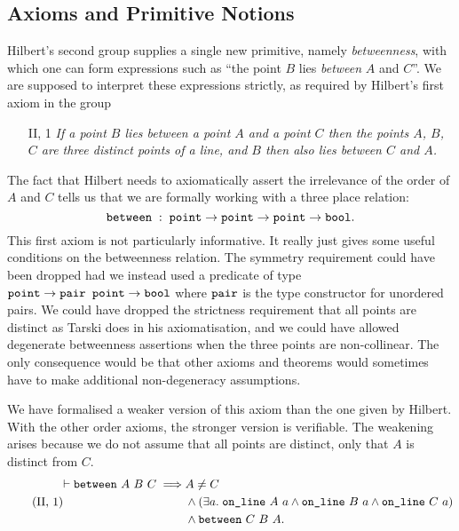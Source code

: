 \subsection{Axioms and Primitive Notions}
Hilbert's second group supplies a single new primitive, namely \emph{betweenness}, with which one can form expressions such as ``the point $B$ lies \emph{between} $A$ and $C$''. We are supposed to interpret these expressions strictly, as required by Hilbert's first axiom in the group
\begin{enumerate}
\item[II, 1] \emph{If a point $B$ lies between a point $A$ and a point $C$ then the points $A$, $B$, $C$ are three distinct points of a line, and $B$ then also lies between $C$ and $A$.}
\end{enumerate}
The fact that Hilbert needs to axiomatically assert the irrelevance of the order of $A$ and $C$ tells us that we are formally working with a three place relation:
\begin{displaymath}
\texttt{between}\;:\;\texttt{point}\rightarrow\texttt{point}\rightarrow\texttt{point}\rightarrow\texttt{bool}.
\end{displaymath}
This first axiom is not particularly informative. It really just gives some useful conditions on the betweenness relation. The symmetry requirement could have been dropped had we instead used a predicate of type $\texttt{point}\rightarrow \texttt{pair point} \rightarrow \texttt{bool}$ where $\texttt{pair}$ is the type constructor for unordered pairs. We could have dropped the strictness requirement that all points are distinct as Tarski does in his axiomatisation, and we could have allowed degenerate betweenness assertions when the three points are non-collinear. The only consequence would be that other axioms and theorems would sometimes have to make additional non-degeneracy assumptions.

We have formalised a weaker version of this axiom than the one given by Hilbert. With the other order axioms, the stronger version is verifiable. The weakening arises because we do not assume that all points are distinct, only that $A$ is distinct from $C$.
\begin{equation}\label{eq:g21}
 \tag{II,~1}
  \begin{split}
    \vdash\texttt{between}\ A\ B\ C \implies & A \neq C\\
                               & \wedge (\exists a.\; \texttt{on\_line}\ A\ a \wedge \texttt{on\_line}\ B\ a \wedge \texttt{on\_line}\ C\ a)\\
                               & \wedge \texttt{between}\ C\ B\ A.
  \end{split}
\end{equation}


